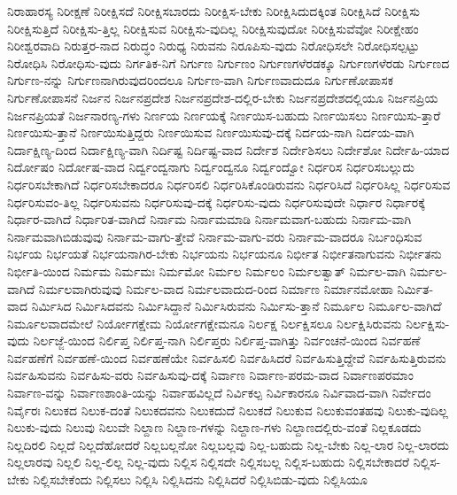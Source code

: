 {ನಿರಾಹಾರಸ್ಯ
ನಿರೀಕ್ಷಣೆ
ನಿರೀಕ್ಷಿಸದೆ
ನಿರೀಕ್ಷಿಸಬಾರದು
ನಿರೀಕ್ಷಿಸ-ಬೇಕು
ನಿರೀಕ್ಷಿಸಿದುದಕ್ಕಿಂತ
ನಿರೀಕ್ಷಿಸಿದೆ
ನಿರೀಕ್ಷಿಸು
ನಿರೀಕ್ಷಿಸುತ್ತಿದೆ
ನಿರೀಕ್ಷಿಸು-ತ್ತಿಲ್ಲ
ನಿರೀಕ್ಷಿಸುವ
ನಿರೀಕ್ಷಿಸು-ವುದಿಲ್ಲ
ನಿರೀಕ್ಷಿಸುವುದೋ
ನಿರೀಕ್ಷಿಸುವೆವೋ
ನಿರೀಕ್ಷೇಹಂ
ನಿರೀಶ್ವರವಾದಿ
ನಿರುತ್ತರ-ನಾದ
ನಿರುದ್ಧಂ
ನಿರುಧ್ಯ
ನಿರುವನು
ನಿರೂಪಿಸು-ವುದು
ನಿರೋಧಿಸಲೇ
ನಿರೋಧಿಸಲ್ಪಟ್ಟು
ನಿರೋಧಿಸಿ
ನಿರೋಧಿಸು-ವುದು
ನಿರ್ಗತಿಕ-ನಿಗೆ
ನಿರ್ಗುಣ
ನಿರ್ಗುಣಂ
ನಿರ್ಗುಣಗಳೆರಡಕ್ಕೂ
ನಿರ್ಗುಣಗಳೆರಡು
ನಿರ್ಗುಣದ
ನಿರ್ಗುಣ-ನನ್ನು
ನಿರ್ಗುಣನಾಗಿರುವುದರಿಂದಲೂ
ನಿರ್ಗುಣ-ವಾಗಿ
ನಿರ್ಗುಣವಾದುದೂ
ನಿರ್ಗುಣೋಪಾಸಕ
ನಿರ್ಗುಣೋಪಾಸನೆ
ನಿರ್ಜನ
ನಿರ್ಜನಪ್ರದೇಶ
ನಿರ್ಜನಪ್ರದೇಶ-ದಲ್ಲಿರ-ಬೇಕು
ನಿರ್ಜನಪ್ರದೇಶದಲ್ಲಿಯೂ
ನಿರ್ಜನಪ್ರಿಯ
ನಿರ್ಜನಪ್ರಿಯತೆ
ನಿರ್ಜನಾರಣ್ಯ-ಗಳು
ನಿರ್ಣಯ
ನಿರ್ಣಯಕ್ಕೆ
ನಿರ್ಣಯಿಸ-ಬಹುದು
ನಿರ್ಣಯಿಸಲು
ನಿರ್ಣಯಿಸು-ತ್ತಾರೆ
ನಿರ್ಣಯಿಸು-ತ್ತಾನೆ
ನಿರ್ಣಯಿಸುತ್ತಿದ್ದರು
ನಿರ್ಣಯಿಸುವ
ನಿರ್ಣಯಿಸುವು-ದಕ್ಕೆ
ನಿರ್ದಯ-ನಾಗಿ
ನಿರ್ದಯ-ವಾಗಿ
ನಿರ್ದಾಕ್ಷಿಣ್ಯ-ದಿಂದ
ನಿರ್ದಾಕ್ಷಿಣ್ಯ-ವಾಗಿ
ನಿರ್ದಿಷ್ಟ
ನಿರ್ದಿಷ್ಟ-ವಾದ
ನಿರ್ದೇಶ
ನಿರ್ದೇಶಿಸಲು
ನಿರ್ದೇಶೋ
ನಿರ್ದೇಹಿ-ಯಾದ
ನಿರ್ದೋಷಂ
ನಿರ್ದೋಷ-ವಾದ
ನಿರ್ದ್ವಂದ್ವನಾಗು
ನಿರ್ದ್ವಂದ್ವನೂ
ನಿರ್ದ್ವಂದ್ವೋ
ನಿರ್ಧರಿಸ
ನಿರ್ಧರಿಸಬಲ್ಲುದು
ನಿರ್ಧರಿಸಬೇಕಾಗಿದೆ
ನಿರ್ಧರಿಸಬೇಕಾದರೂ
ನಿರ್ಧರಿಸಲಿ
ನಿರ್ಧರಿಸಿಕೊಂಡಿರುವನು
ನಿರ್ಧರಿಸಿದೆ
ನಿರ್ಧರಿಸಿಲ್ಲ
ನಿರ್ಧರಿಸುವ
ನಿರ್ಧರಿಸುವಂ-ತಿಲ್ಲ
ನಿರ್ಧರಿಸುವನು
ನಿರ್ಧರಿಸುವು-ದಕ್ಕೆ
ನಿರ್ಧರಿಸು-ವುದು
ನಿರ್ಧರಿಸುವುದೇ
ನಿರ್ಧಾರ
ನಿರ್ಧಾರಕ್ಕೆ
ನಿರ್ಧಾರ-ವಾಗಿದೆ
ನಿರ್ಧಾರಿತ-ವಾಗಿದೆ
ನಿರ್ನಾಮ
ನಿರ್ನಾಮಮಾಡಿ
ನಿರ್ನಾಮವಾಗ-ಬಹುದು
ನಿರ್ನಾಮ-ವಾಗಿ
ನಿರ್ನಾಮವಾಗಿಬಿಡುವುವು
ನಿರ್ನಾಮ-ವಾಗು-ತ್ತೇವೆ
ನಿರ್ನಾಮ-ವಾಗು-ವರು
ನಿರ್ನಾಮ-ವಾದರೂ
ನಿರ್ಬಂಧಿಸುವ
ನಿರ್ಭಯ
ನಿರ್ಭಯತೆ
ನಿರ್ಭಯನಾಗಿರ-ಬೇಕು
ನಿರ್ಭಯನು
ನಿರ್ಭಯನೂ
ನಿರ್ಭೀತ
ನಿರ್ಭೀತನಾಗುವನು
ನಿರ್ಭೀತನು
ನಿರ್ಭೀತಿ-ಯಿಂದ
ನಿರ್ಮಮ
ನಿರ್ಮಮಃ
ನಿರ್ಮಮೋ
ನಿರ್ಮಲ
ನಿರ್ಮಲಂ
ನಿರ್ಮಲತ್ವಾತ್
ನಿರ್ಮಲ-ವಾಗಿ
ನಿರ್ಮಲ-ವಾಗಿದೆ
ನಿರ್ಮಲವಾಗಿರುವುವು
ನಿರ್ಮಲ-ವಾದ
ನಿರ್ಮಲವಾದುದ-ರಿಂದ
ನಿರ್ಮಾಣ
ನಿರ್ಮಾನಮೋಹಾ
ನಿರ್ಮಿತ-ವಾದ
ನಿರ್ಮಿಸಿದ
ನಿರ್ಮಿಸಿದವನು
ನಿರ್ಮಿಸಿದ್ದಾನೆ
ನಿರ್ಮಿಸಿರುವನು
ನಿರ್ಮಿಸು-ತ್ತಾನೆ
ನಿರ್ಮೂಲ
ನಿರ್ಮೂಲ-ವಾಗಿದೆ
ನಿರ್ಮೂಲವಾದಮೇಲೆ
ನಿರ್ಯೋಗಕ್ಷೇಮ
ನಿರ್ಯೋಗಕ್ಷೇಮನೂ
ನಿರ್ಲಕ್ಷ
ನಿರ್ಲಕ್ಷಿಸಲೂ
ನಿರ್ಲಕ್ಷಿಸಿರುವನು
ನಿರ್ಲಕ್ಷಿಸು-ವುದು
ನಿರ್ಲಜ್ಜೆ-ಯಿಂದ
ನಿರ್ಲಿಪ್ತ
ನಿರ್ಲಿಪ್ತ-ನಾಗಿ
ನಿರ್ಲಿಪ್ತರು
ನಿರ್ಲಿಪ್ತ-ವಾಗಿತ್ತು
ನಿರ್ವಂಚನೆ-ಯಿಂದ
ನಿರ್ವಹಣೆ
ನಿರ್ವಹಣೆಗೆ
ನಿರ್ವಹಣೆ-ಯಿಂದ
ನಿರ್ವಹಣೆಯೇ
ನಿರ್ವಹಿಸಲಿ
ನಿರ್ವಹಿಸಿದರೆ
ನಿರ್ವಹಿಸುತ್ತಿದ್ದೇವೆ
ನಿರ್ವಹಿಸುತ್ತಿರುವನು
ನಿರ್ವಹಿಸುವನು
ನಿರ್ವಹಿಸು-ವರು
ನಿರ್ವಹಿಸುವು-ದಕ್ಕೆ
ನಿರ್ವಾಣ
ನಿರ್ವಾಣ-ಪರಮ-ವಾದ
ನಿರ್ವಾಣಪರಮಾಂ
ನಿರ್ವಾಣ-ವನ್ನು
ನಿರ್ವಾಣಶಾಂತಿ-ಯನ್ನು
ನಿರ್ವಾಹವಿಲ್ಲದೆ
ನಿರ್ವಿಕಲ್ಪ
ನಿರ್ವಿಕಾರನೂ
ನಿರ್ವಿವಾದ-ವಾಗಿ
ನಿರ್ವೇದಂ
ನಿರ್ವೈರಃ
ನಿಲುಕದ
ನಿಲುಕ-ದಂತೆ
ನಿಲುಕದವನು
ನಿಲುಕದುದೆ
ನಿಲುಕದೆ
ನಿಲುಕುವ
ನಿಲುಕುವಂತಹವು
ನಿಲುಕು-ವುದಿಲ್ಲ
ನಿಲುಕು-ವುದು
ನಿಲುವು
ನಿಲುವೇ
ನಿಲ್ದಾಣ
ನಿಲ್ದಾಣ-ಗಳನ್ನು
ನಿಲ್ದಾಣ-ಗಳು
ನಿಲ್ದಾಣದಲ್ಲಿರು-ವಂತೆ
ನಿಲ್ಲಕೂಡದು
ನಿಲ್ಲದಿರಲಿ
ನಿಲ್ಲದೆ
ನಿಲ್ಲದೆಹೋದರೆ
ನಿಲ್ಲಬಲ್ಲನೋ
ನಿಲ್ಲಬಲ್ಲವು
ನಿಲ್ಲ-ಬಹುದು
ನಿಲ್ಲ-ಬೇಕು
ನಿಲ್ಲ-ಲಾರ
ನಿಲ್ಲ-ಲಾರದು
ನಿಲ್ಲಲಾರವು
ನಿಲ್ಲಲಿ
ನಿಲ್ಲ-ಲಿಲ್ಲ
ನಿಲ್ಲ-ವುದು
ನಿಲ್ಲಿಸ
ನಿಲ್ಲಿಸದೇ
ನಿಲ್ಲಿಸಬಲ್ಲ
ನಿಲ್ಲಿಸ-ಬಹುದು
ನಿಲ್ಲಿಸಬೇಕಾದರೆ
ನಿಲ್ಲಿಸ-ಬೇಕು
ನಿಲ್ಲಿಸಬೇಕೆಂದು
ನಿಲ್ಲಿಸಲು
ನಿಲ್ಲಿಸಿ
ನಿಲ್ಲಿಸಿದನು
ನಿಲ್ಲಿಸಿದರೆ
ನಿಲ್ಲಿಸಿಬಿಡು-ವುದು
ನಿಲ್ಲಿಸಿಯೂ
}
